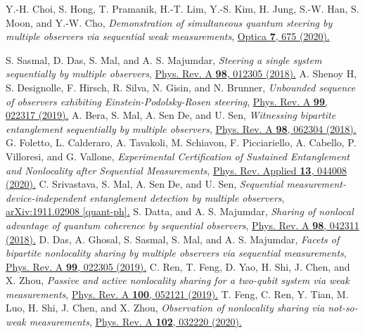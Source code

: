 \documentclass[pra,a4paper,aps,twocolumn,showpacs,superscriptaddress,groupedaddress]{revtex4}
\begin{document}
\begin{thebibliography}{1}
 Y.-H. Choi, S. Hong, T. Pramanik, H.-T. Lim, Y.-S. Kim, H. Jung, S.-W. Han, S. Moon, and Y.-W. Cho, \emph{Demonstration of simultaneous quantum steering by multiple observers via sequential weak measurements}, \href{https://www.osapublishing.org/optica/fulltext.cfm?uri=optica-7-6-675&id=432421}{Optica {\bf 7}, 675 (2020).}

 S. Sasmal, D. Das, S. Mal, and A. S. Majumdar, \emph{Steering a single system sequentially by multiple observers}, \href{https://journals.aps.org/pra/abstract/10.1103/PhysRevA.98.012305}{Phys. Rev. A \textbf{98}, 012305 (2018).}
 A. Shenoy H, S. Designolle, F. Hirsch, R. Silva, N. Gisin, and N. Brunner, \emph{Unbounded sequence of observers exhibiting Einstein-Podolsky-Rosen steering}, \href{https://journals.aps.org/pra/abstract/10.1103/PhysRevA.99.022317}{Phys. Rev. A {\bf 99}, 022317 (2019).}
 A. Bera, S. Mal, A. Sen De, and U. Sen, \emph{Witnessing bipartite entanglement sequentially by multiple observers}, \href{https://journals.aps.org/pra/abstract/10.1103/PhysRevA.98.062304}{Phys. Rev. A {\bf 98}, 062304 (2018).}
  G. Foletto, L. Calderaro, A. Tavakoli, M. Schiavon, F. Picciariello, A. Cabello, P. Villoresi, and G. Vallone, \emph{Experimental Certification of Sustained Entanglement and Nonlocality after Sequential Measurements}, \href{https://journals.aps.org/prapplied/abstract/10.1103/PhysRevApplied.13.044008}{Phys. Rev. Applied {\bf 13}, 044008 (2020).}
 C. Srivastava, S. Mal, A. Sen De, and U. Sen, \emph{Sequential measurement-device-independent entanglement detection by multiple observers}, \href{https://arxiv.org/abs/1911.02908}{	arXiv:1911.02908 [quant-ph].}
 S. Datta, and A. S. Majumdar, \emph{Sharing of nonlocal advantage of quantum coherence by sequential observers}, \href{https://journals.aps.org/pra/abstract/10.1103/PhysRevA.98.042311}{Phys. Rev. A {\bf 98}, 042311 (2018).}
 D. Das, A. Ghosal, S. Sasmal, S. Mal, and A. S. Majumdar, \emph{Facets of bipartite nonlocality sharing by multiple observers via sequential measurements}, \href{https://journals.aps.org/pra/abstract/10.1103/PhysRevA.99.022305}{Phys. Rev. A {\bf 99}, 022305 (2019).}
 C. Ren, T. Feng, D. Yao, H. Shi, J. Chen, and X. Zhou, \emph{Passive and active nonlocality sharing for a two-qubit system via weak measurements}, \href{https://journals.aps.org/pra/abstract/10.1103/PhysRevA.100.052121}{Phys. Rev. A {\bf 100}, 052121 (2019).}
 T. Feng, C. Ren, Y. Tian, M. Luo, H. Shi, J. Chen, and X. Zhou, \emph{Observation of nonlocality sharing via not-so-weak measurements}, \href{https://journals.aps.org/pra/abstract/10.1103/PhysRevA.102.032220}{Phys. Rev. A {\bf 102}, 032220 (2020).} 

\end{thebibliography}
\end{document}
